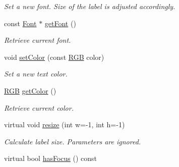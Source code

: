 \begin{DoxyCompactItemize}
\begin{DoxyCompactList}\small\item\em Set a new font. Size of the label is adjusted accordingly. \end{DoxyCompactList}\item 
\hypertarget{classGUI_1_1Label_a396846f4fb4728816c37d43985ca95dc}{const \hyperlink{classGUI_1_1Font}{Font} $\ast$ \hyperlink{classGUI_1_1Label_a396846f4fb4728816c37d43985ca95dc}{get\-Font} ()}\label{classGUI_1_1Label_a396846f4fb4728816c37d43985ca95dc}

\begin{DoxyCompactList}\small\item\em Retrieve current font. \end{DoxyCompactList}\item 
\hypertarget{classGUI_1_1Label_a777ec1e46d719b55d5ca04e0b92203d2}{void \hyperlink{classGUI_1_1Label_a777ec1e46d719b55d5ca04e0b92203d2}{set\-Color} (const \hyperlink{namespaceGUI_aeafd135255365f3584da0e982fc79466}{R\-G\-B} color)}\label{classGUI_1_1Label_a777ec1e46d719b55d5ca04e0b92203d2}

\begin{DoxyCompactList}\small\item\em Set a new text color. \end{DoxyCompactList}\item 
\hypertarget{classGUI_1_1Label_aae93d1b80ef6ccc6dbcad1d3e01d0e49}{\hyperlink{namespaceGUI_aeafd135255365f3584da0e982fc79466}{R\-G\-B} \hyperlink{classGUI_1_1Label_aae93d1b80ef6ccc6dbcad1d3e01d0e49}{get\-Color} ()}\label{classGUI_1_1Label_aae93d1b80ef6ccc6dbcad1d3e01d0e49}

\begin{DoxyCompactList}\small\item\em Retrieve current color. \end{DoxyCompactList}\item 
\hypertarget{classGUI_1_1Label_a0a19005bc37fac28c857036e8dc48b2e}{virtual void \hyperlink{classGUI_1_1Label_a0a19005bc37fac28c857036e8dc48b2e}{resize} (int w=-\/1, int h=-\/1)}\label{classGUI_1_1Label_a0a19005bc37fac28c857036e8dc48b2e}

\begin{DoxyCompactList}\small\item\em Calculate label size. Parameters are ignored. \end{DoxyCompactList}\item 
\hypertarget{classGUI_1_1Label_a84714f868d1ada9134f58804097cef3b}{virtual bool \hyperlink{classGUI_1_1Label_a84714f868d1ada9134f58804097cef3b}{has\-Focus} () const }\label{classGUI_1_1Label_a84714f868d1ada9134f58804097cef3b}


\end{DoxyCompactItemize}
